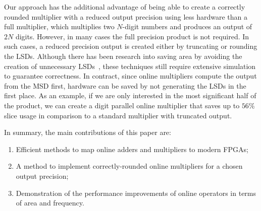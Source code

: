 \documentclass[conference]{IEEEtran}
\begin{document}
Our approach has the additional advantage of being able to create a correctly rounded multiplier with a reduced output precision using less hardware than a full multiplier, which multiplies two $N$-digit numbers and produces an output of $2N$ digits. However, in many cases the full precision product is not required. In such cases, a reduced precision output is created either by truncating or rounding the LSDs. Although there has been research into saving area by avoiding the creation of unnecessary LSDs~\cite{TheoTC}, these techniques still require extensive simulation to guarantee correctness. In contract, since online multipliers compute the output from the MSD first, hardware can be saved by not generating the LSDs in the first place. As an example, if we are only interested in the most significant half of the product, we can create a digit parallel online multiplier that saves up to $56\%$ slice usage in comparison to a standard multiplier with truncated output.\vspace{-0.5ex}



In summary, the main contributions of this paper are:\vspace{-0.5ex}
\begin{enumerate}
    \item Efficient methods to map online adders and multipliers to modern FPGAs;
    \item A method to implement correctly-rounded online multipliers for a chosen output precision;
    \item Demonstration of the performance improvements of online operators in terms of area and frequency.
\end{enumerate}\vspace{-1ex}

\end{document}
